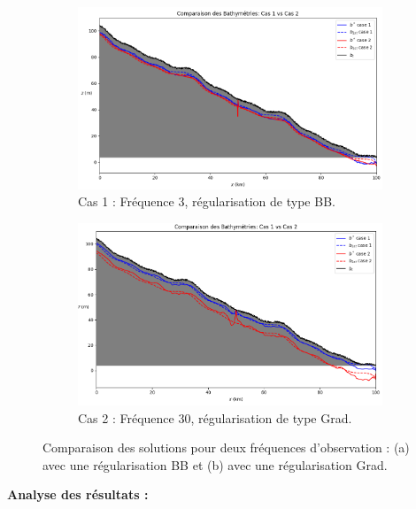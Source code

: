 \documentclass{article}
\begin{document}
\begin{figure}[H]
    \centering
    \begin{subfigure}[b]{0.48\textwidth}
        \includegraphics[width=\linewidth]{Images_Ayoub/Test_Cases_Tasks/Monitored/3/Pasted image.png}
        \caption{Cas 1 : Fréquence 3, régularisation de type BB.}
        \label{fig:cas1}
    \end{subfigure}
    \hfill
    \begin{subfigure}[b]{0.48\textwidth}
        \includegraphics[width=\linewidth]{Images_Ayoub/Test_Cases_Tasks/Monitored/30/Pasted image.png}
        \caption{Cas 2 : Fréquence 30, régularisation de type Grad.}
        \label{fig:cas2}
    \end{subfigure}
    \caption{Comparaison des solutions pour deux fréquences d'observation : (a) avec une régularisation BB et (b) avec une régularisation Grad.}
    \label{fig:comparison}
\end{figure}

\noindent\textbf{Analyse des résultats :}\
\end{document}

